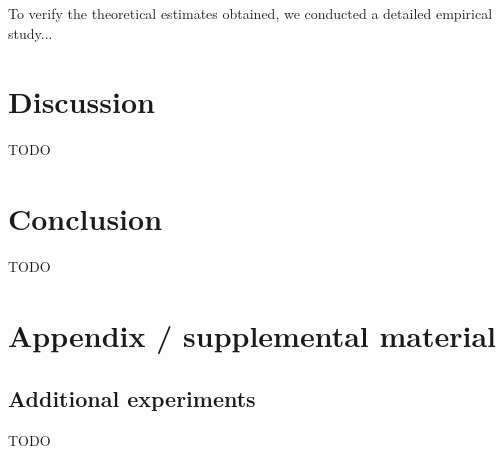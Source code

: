 \documentclass{article}
\begin{document}
To verify the theoretical estimates obtained, we conducted a detailed empirical study...

\section{Discussion}\label{sec:disc}

TODO

\section{Conclusion}\label{sec:concl}

TODO







\newpage
\appendix
\section{Appendix / supplemental material}\label{app}

\subsection{Additional experiments}\label{app:exp}

TODO
\end{document}
